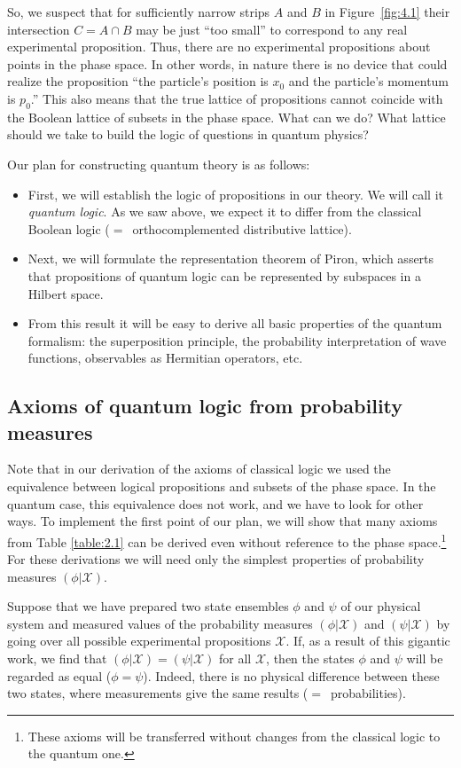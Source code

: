 \documentclass[nochecklpage]{stefan1}
\theoremstyle{definition}
\begin{document}
So, we suspect that for sufficiently narrow strips $A$ and $B$ in Figure~\ref{fig:4.1} their intersection $ C = A \cap B $ may be just ``too small''
to correspond to any real experimental proposition. Thus, there are no
experimental propositions about points in the phase space. In other
words, in nature there is no device that could realize the proposition
``the particle's position is $ x_{0} $ and the particle's momentum is
$ p_{0} $.'' This also means that the true lattice of propositions
cannot coincide with the Boolean lattice of subsets in the phase space.
What can we do? What lattice should we take to build the logic of
questions in quantum physics?

Our plan for constructing quantum theory is as follows:
%
\begin{itemize}
\item  First, we will establish the logic of propositions in
our theory. We will call it \emph{quantum logic}. As we saw above, we
expect it to differ from the classical Boolean logic ($=$~orthocomplemented distributive lattice).
\item  Next, we will formulate the representation theorem of
Piron, which asserts that propositions of quantum logic can be
represented by subspaces in a Hilbert space.
\item  From this result it will be easy to derive all basic
properties of the quantum formalism: the superposition principle, the
probability interpretation of wave functions, observables as Hermitian
operators, etc.
\end{itemize}
%
\subsection{Axioms of quantum logic from probability measures}\label{ss:compatibility1}
Note that in our derivation of the axioms of classical logic we used the
equivalence between logical propositions and subsets of the phase space.
In the quantum case, this equivalence does not work, and we have to look
for other ways. To implement the first point of our plan, we will show
that many axioms from Table \ref{table:2.1} can be derived even without
reference to the phase space.\footnote{These axioms will be
transferred without changes from the classical logic to the quantum
one.} For these derivations we will need only the simplest properties
of probability measures $ (\phi | \mathcal{X}) $.

Suppose that we have prepared two state ensembles $ \phi $ and
$ \psi $ of our physical system and measured values of the probability
measures $ (\phi | \mathcal{X}) $ and $ (\psi | \mathcal{X}) $ by going
over all possible experimental propositions $ \mathcal{X} $. If, as a
result of this gigantic work, we find that $ (\phi |\mathcal{X}) = (\psi |\mathcal{X}) $
for all $ \mathcal{X} $, then the states $ \phi $ and $ \psi $ will be
regarded as equal ($ \phi = \psi $). Indeed, there is no physical
difference between these two states, where measurements give the same
results ($=$~probabilities).
\end{document}
